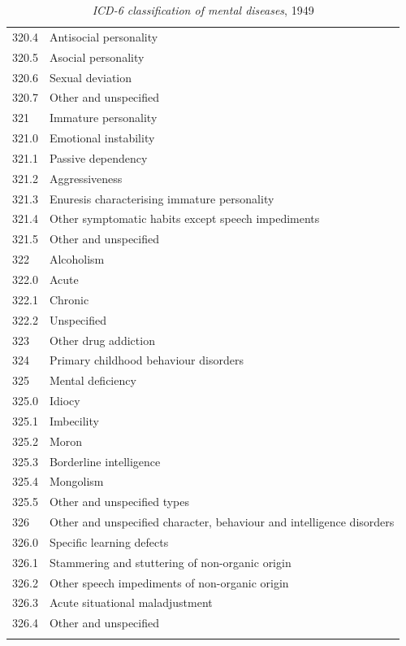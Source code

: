 \begin{refsection}
\begin{longtable}[!t]{ | p{2cm} | p{11.8cm} | }
320.4&     Antisocial personality\\
320.5&     Asocial personality\\
320.6&     Sexual deviation\\
320.7&     Other and unspecified\\
321&Immature personality\\
321.0&     Emotional instability\\
321.1&     Passive dependency\\
321.2&     Aggressiveness\\
321.3&     Enuresis characterising immature personality\\
321.4&     Other symptomatic habits except speech impediments\\
321.5&     Other and unspecified\\
322&Alcoholism\\
322.0&     Acute\\
322.1&     Chronic\\
322.2&     Unspecified\\
323&Other drug addiction\\
324&Primary childhood behaviour disorders\\
325&Mental deficiency\\
325.0&     Idiocy\\
325.1&     Imbecility\\
325.2&     Moron\\
325.3&     Borderline intelligence\\
325.4&     Mongolism\\
325.5&     Other and unspecified types\\
326&Other and unspecified character, behaviour and intelligence disorders\\
326.0&     Specific learning defects\\
326.1&     Stammering and stuttering of non-organic origin\\
326.2&     Other speech impediments of non-organic origin\\
326.3&     Acute situational maladjustment\\
326.4&     Other and unspecified\\ \hline
\caption{\emph{ICD-6 classification of mental diseases}, 1949}
\label{table: 1949Classification}
\end{longtable}


\end{refsection}
